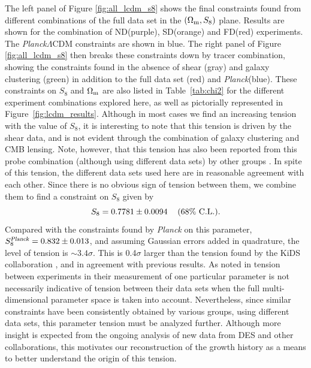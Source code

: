 \documentclass[a4paper,11pt]{article}
\newcommand{\Om}{\Omega_{\rm m}}
\newcommand{\lcdm}{$\Lambda$CDM\xspace}
\newcommand{\des}{DES\xspace}
\newcommand{\kids}{KiDS\xspace}
\newcommand{\planck}{{\sl Planck}\xspace}
\newcommand{\northd}{ND\xspace}
\newcommand{\southd}{SD\xspace}
\newcommand{\alld}{FD\xspace}
\begin{document}
      The left panel of Figure \ref{fig:all_lcdm_s8} shows the final constraints found from different combinations of the full data set in the $(\Om, S_8)$ plane. Results are shown for the combination of \northd (purple), \southd (orange) and \alld (red) experiments. The \planck \lcdm constraints are shown in blue. The right panel of Figure \ref{fig:all_lcdm_s8} then breaks these constraints down by tracer combination, showing the constraints found in the absence of shear (gray) and galaxy clustering (green) in addition to the full data set (red) and \planck (blue). These constraints on $S_8$ and $\Om$ are also listed in Table~\ref{tab:chi2} for the different experiment combinations explored here, as well as pictorially represented in Figure~\ref{fig:lcdm_results}. Although in most cases we find an increasing tension with the value of $S_8$, it is interesting to note that this tension is driven by the shear data, and is not evident through the combination of galaxy clustering and CMB lensing. Note, however, that this tension has also been reported from this probe combination (although using different data sets) by other groups \cite{2010.00466,2105.03421}. In spite of this tension, the different data sets used here are in reasonable agreement with each other. Since there is no obvious sign of tension between them, we combine them to find a constraint on $S_8$ given by
      \begin{equation}
        S_8=0.7781\pm0.0094\hspace{12pt}(68\%\,\,{\rm C.L.}).
      \end{equation}
      Compared with the constraints found by \planck on this parameter, $S_8^\text{\planck}=0.832\pm0.013$, and assuming Gaussian errors added in quadrature, the level of tension is $\sim3.4\sigma$. This is 0.4$\sigma$ larger than the tension found by the \kids collaboration \cite{2007.15632,2105.09545}, and in agreement with previous results. As noted in \cite{1902.04029,2007.15632} tension between experiments in their measurement of one particular parameter is not necessarily indicative of tension between their data sets when the full multi-dimensional parameter space is taken into account. Nevertheless, since similar constraints have been consistently obtained by various groups, using different data sets, this parameter tension must be analyzed further. Although more insight is expected from the ongoing analysis of new data from \des and other collaborations, this motivates our reconstruction of the growth history as a means to better understand the origin of this tension.
\end{document}
